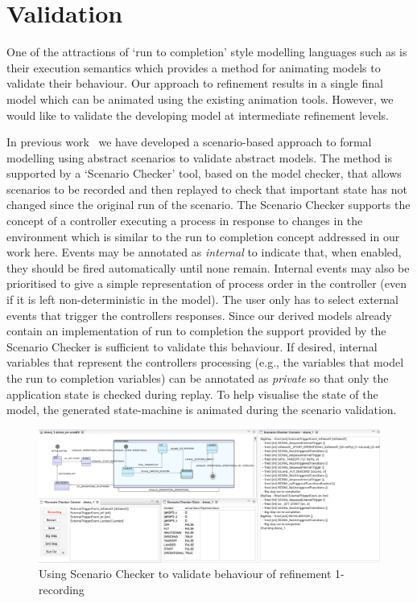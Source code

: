 

\section{Validation}
\label{sec:validation}

One of the attractions of `run to completion' style modelling languages such as \SCXML is their execution semantics which provides a method for animating models to validate their behaviour.
Our approach to \SCXML refinement results in a single \SCXML final model which can be animated using the existing \SCXML animation tools.
However, we would like to validate the developing \UMLB model at intermediate refinement levels. 

In previous work~\cite{snook20JSA} we have developed a scenario-based approach to formal modelling using abstract scenarios to validate abstract models.
The method is supported by a `Scenario Checker' tool, based on the \PROB model checker, that allows scenarios to be recorded and then replayed to check that important state has not changed since the original run of the scenario.
The Scenario Checker supports the concept of a controller executing a process in response to changes in the environment which is similar to the run to completion concept addressed in our work here.
Events may be annotated as \emph{internal} to indicate that, when enabled, they should be fired automatically until none remain.
Internal events may also be prioritised to give a simple representation of process order in the controller (even if it is left non-deterministic in the model).
The user only has to select external events that trigger the controllers responses.
Since our \SCXML derived models already contain an implementation of run to completion the support provided by the Scenario Checker is sufficient to validate this behaviour.
If desired, internal variables that represent the controllers processing (e.g., the variables that model the \SCXML run to completion variables) can be annotated as \emph{private} so that only the application state is checked during replay.
To help visualise the state of the model, the generated \UMLB state-machine is animated during the scenario validation.

\begin{figure}[!th]
	\centering
	\includegraphics[width=1.0\textwidth, trim=30 6 113 0, clip]{figures/scenarioChecker_recording_drone1.png}
	\caption{Using Scenario Checker to validate behaviour of refinement 1- recording}
	\label{fig:scenarioCheckerRecordingDrone1}
\end{figure}

